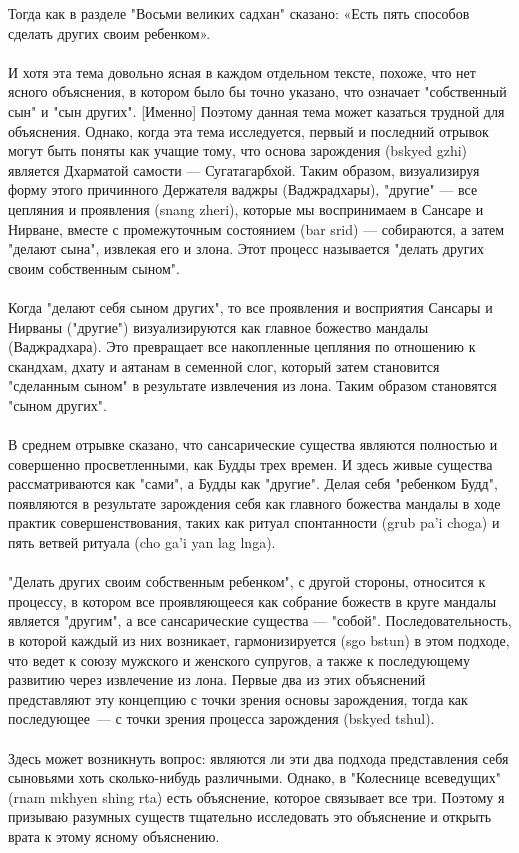 \begin{siderules}
Тогда как в разделе "Восьми великих садхан" сказано:
«Есть пять способов сделать других своим ребенком».\\
\\
И хотя эта тема довольно ясная в каждом отдельном тексте, похоже, что нет ясного
объяснения, в котором было бы точно указано, что означает "собственный сын" и "сын
других". [Именно] Поэтому данная тема может казаться трудной для объяснения.
Однако, когда эта тема исследуется, первый и последний отрывок могут быть поняты как учащие
тому, что основа зарождения (bskyed gzhi) является Дхарматой самости — Сугатагарбхой.
Таким образом, визуализируя форму этого причинного Держателя ваджры (Ваджрадхары),
"другие" — все цепляния и проявления (snang zheri), которые мы воспринимаем в Сансаре и
Нирване, вместе с промежуточным состоянием (bar srid) — собираются, а затем
"делают сына", извлекая его и злона. Этот процесс называется "делать других
своим собственным сыном".\\
\\
Когда "делают себя сыном других", то все проявления и восприятия Сансары и Нирваны
("другие") визуализируются как главное божество мандалы (Ваджрадхара). Это превращает
все накопленные цепляния по отношению к скандхам, дхату и аятанам в семенной слог,
который затем становится "сделанным сыном" в результате извлечения из лона. Таким
образом становятся "сыном других".\\
\\
В среднем отрывке сказано, что сансарические существа являются полностью и совершенно
просветленными, как Будды трех времен. И здесь живые существа рассматриваются как
"сами", а Будды как "другие". Делая себя "ребенком Будд", появляются в результате
зарождения себя как главного божества мандалы в ходе практик совершенствования,
таких как ритуал спонтанности (grub pa'i choga) и пять ветвей ритуала (cho ga'i yan lag lnga).\\
\\
"Делать других своим собственным ребенком", с другой стороны, относится к процессу,
в котором все проявляющееся как собрание божеств в круге мандалы является "другим",
а все сансарические существа — "собой". Последовательность, в которой каждый из них возникает,
гармонизируется (sgo bstun) в этом подходе, что ведет к союзу мужского и женского
супругов, а также к последующему развитию через извлечение из лона. Первые два из этих
объяснений представляют эту концепцию с точки зрения основы зарождения, тогда как
последующее — с точки зрения процесса зарождения (bskyed tshul).\\
\\
Здесь может возникнуть вопрос: являются ли эти два подхода представления себя сыновьями
хоть сколько-нибудь различными. Однако, в "Колеснице всеведущих" (rnam mkhyen shing
rta) есть объяснение, которое связывает все три. Поэтому я призываю разумных существ
тщательно исследовать это объяснение и открыть врата к этому ясному объяснению.\\
\\
\end{siderules}

